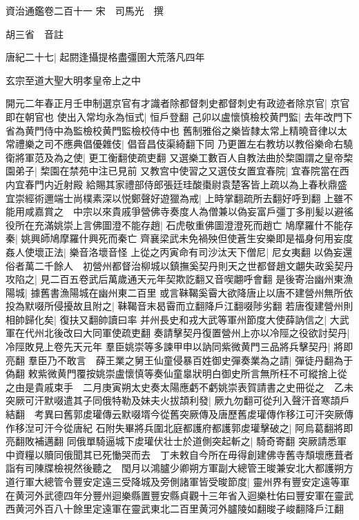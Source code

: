資治通鑑卷二百十一
宋　司馬光　撰

胡三省　音註

唐紀二十七|{
	起閼逢攝提格盡彊圉大荒落凡四年}


玄宗至道大聖大明孝皇帝上之中

開元二年春正月壬申制選京官有才識者除都督刺史都督刺史有政迹者除京官|{
	京官即在朝官也}
使出入常均永為恒式|{
	恒戶登翻}
己卯以盧懷慎檢校黄門監|{
	去年改門下省為黄門侍中為監檢校黄門監檢校侍中也}
舊制雅俗之樂皆隸太常上精曉音律以太常禮樂之司不應典倡優雜伎|{
	倡音昌伎渠綺翻下同}
乃更置左右教坊以教俗樂命右驍衛將軍范及為之使|{
	更工衡翻使疏吏翻}
又選樂工數百人自教法曲於棃園謂之皇帝棃園弟子|{
	棃園在禁苑中注已見前}
又教宫中使習之又選伎女置宜春院|{
	宜春院當在西内宜春門内近射殿}
給賜其家禮部侍郎張廷珪酸棗尉袁楚客皆上疏以為上春秋鼎盛宜崇經術邇端士尚樸素深以悦鄭聲好遊獵為戒|{
	上時掌翻疏所去翻好呼到翻}
上雖不能用咸嘉賞之　中宗以來貴戚爭營佛寺奏度人為僧兼以偽妄富戶彊丁多削髪以避徭役所在充滿姚崇上言佛圖澄不能存趙|{
	石虎敬重佛圖澄澄死而趙亡}
鳩摩羅什不能存秦|{
	姚興師鳩摩羅什興死而秦亡}
齊襄梁武未免禍殃但使蒼生安樂即是福身何用妄度姦人使壞正法|{
	樂音洛壞音怪}
上從之丙寅命有司沙汰天下僧尼|{
	尼女夷翻}
以偽妄還俗者萬二千餘人　初營州都督治柳城以鎮撫奚契丹則天之世都督趙文翽失政奚契丹攻陷之|{
	見二百五卷武后萬歲通天元年契欺訖翻又音喫翽呼會翻}
是後寄治幽州東漁陽城|{
	據舊書漁陽城在幽州東二百里}
或言靺鞨奚霫大欲降唐止以唐不建營州無所依投為默啜所侵擾故且附之|{
	靺鞨音末曷霫而立翻降戶江翻啜陟劣翻}
若唐復建營州則相帥歸化矣|{
	復扶又翻帥讀曰率}
并州長史和戎大武等軍州節度大使薛訥信之|{
	大武軍在代州北後改曰大同軍使疏吏翻}
奏請擊契丹復置營州上亦以冷陘之役欲討契丹|{
	冷陘敗見上卷先天元年}
羣臣姚崇等多諫甲申以訥同紫微黄門三品將兵擊契丹|{
	將即亮翻}
羣臣乃不敢言　薛王業之舅王仙童侵暴百姓御史彈奏業為之請|{
	彈徒丹翻為于偽翻}
敕紫微黄門覆按姚崇盧懷慎等奏仙童辠狀明白御史所言無所枉不可縱捨上從之由是貴戚束手　二月庚寅朔太史奏太陽應虧不虧姚崇表賀請書之史冊從之　乙未突厥可汗默啜遣其子同俄特勒及妹夫火拔頡利發|{
	厥九勿翻可從刋入聲汗音寒頡戶結翻　考異曰舊郭䖍瓘傳云默啜壻今從舊突厥傳及唐歷舊䖍瓘傳作移江可汗突厥傳作移湼可汗今從唐紀}
石附失畢將兵圍北庭都護府都護郭䖍瓘擊破之|{
	阿烏葛翻將即亮翻敗補邁翻}
同俄單騎逼城下䖍瓘伏壮士於道側突起斬之|{
	騎奇寄翻}
突厥請悉軍中資糧以贖同俄聞其已死慟哭而去　丁未敕自今所在毋得創建佛寺舊寺頹壞應葺者詣有司陳牒檢視然後聽之　閠月以鴻臚少卿朔方軍副大總管王晙兼安北大都護朔方道行軍大總管令豐安定遠三受降城及旁側諸軍皆受晙節度|{
	靈州界有豐安定遠等軍在黄河外武德四年分豐州迴樂縣置豐安縣貞觀十三年省入迴樂杜佑曰豐安軍在靈武西黄河外百八十餘里定遠軍在靈武東北二百里黄河外臚陵如翻晙子峻翻降戶江翻}

